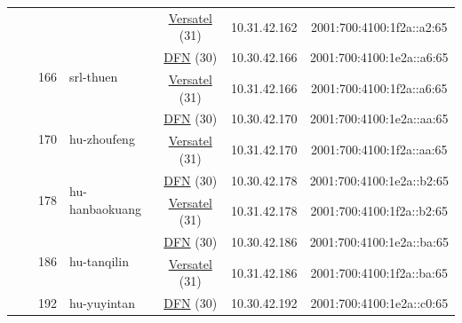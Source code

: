 \begin{small}
\begin{center}
\begin{longtable}{|c|c|c|c|c|c|c|c|}
  &  &  &  & \multicolumn{2}{|c|}{\tiny{\href{http://www.versatel.de}{Versatel} (31)}} & \tiny{10.31.42.162} & \tiny{2001:700:4100:1f2a::a2:65} \\* \cline{3-3}\cline{4-4}\cline{5-5}\cline{6-6}\cline{7-7}\cline{8-8}
  &  & \multirow{2}{*}{\tiny{166}} & \multicolumn{1}{|l|}{\multirow{2}{*}{\tiny{srl-thuen}}} & \multicolumn{2}{|c|}{\tiny{\href{https://www.dfn.de}{DFN} (30)}} & \tiny{10.30.42.166} & \tiny{2001:700:4100:1e2a::a6:65} \\* \cline{5-5}\cline{6-6}\cline{7-7}\cline{8-8}
  &  &  &  & \multicolumn{2}{|c|}{\tiny{\href{http://www.versatel.de}{Versatel} (31)}} & \tiny{10.31.42.166} & \tiny{2001:700:4100:1f2a::a6:65} \\* \cline{3-3}\cline{4-4}\cline{5-5}\cline{6-6}\cline{7-7}\cline{8-8}
  &  & \multirow{2}{*}{\tiny{170}} & \multicolumn{1}{|l|}{\multirow{2}{*}{\tiny{hu-zhoufeng}}} & \multicolumn{2}{|c|}{\tiny{\href{https://www.dfn.de}{DFN} (30)}} & \tiny{10.30.42.170} & \tiny{2001:700:4100:1e2a::aa:65} \\* \cline{5-5}\cline{6-6}\cline{7-7}\cline{8-8}
  &  &  &  & \multicolumn{2}{|c|}{\tiny{\href{http://www.versatel.de}{Versatel} (31)}} & \tiny{10.31.42.170} & \tiny{2001:700:4100:1f2a::aa:65} \\* \cline{3-3}\cline{4-4}\cline{5-5}\cline{6-6}\cline{7-7}\cline{8-8}
  &  & \multirow{2}{*}{\tiny{178}} & \multicolumn{1}{|l|}{\multirow{2}{*}{\tiny{hu-hanbaokuang}}} & \multicolumn{2}{|c|}{\tiny{\href{https://www.dfn.de}{DFN} (30)}} & \tiny{10.30.42.178} & \tiny{2001:700:4100:1e2a::b2:65} \\* \cline{5-5}\cline{6-6}\cline{7-7}\cline{8-8}
  &  &  &  & \multicolumn{2}{|c|}{\tiny{\href{http://www.versatel.de}{Versatel} (31)}} & \tiny{10.31.42.178} & \tiny{2001:700:4100:1f2a::b2:65} \\* \cline{3-3}\cline{4-4}\cline{5-5}\cline{6-6}\cline{7-7}\cline{8-8}
  &  & \multirow{2}{*}{\tiny{186}} & \multicolumn{1}{|l|}{\multirow{2}{*}{\tiny{hu-tanqilin}}} & \multicolumn{2}{|c|}{\tiny{\href{https://www.dfn.de}{DFN} (30)}} & \tiny{10.30.42.186} & \tiny{2001:700:4100:1e2a::ba:65} \\* \cline{5-5}\cline{6-6}\cline{7-7}\cline{8-8}
  &  &  &  & \multicolumn{2}{|c|}{\tiny{\href{http://www.versatel.de}{Versatel} (31)}} & \tiny{10.31.42.186} & \tiny{2001:700:4100:1f2a::ba:65} \\* \cline{3-3}\cline{4-4}\cline{5-5}\cline{6-6}\cline{7-7}\cline{8-8}
  &  & \multirow{2}{*}{\tiny{192}} & \multicolumn{1}{|l|}{\multirow{2}{*}{\tiny{hu-yuyintan}}} & \multicolumn{2}{|c|}{\tiny{\href{https://www.dfn.de}{DFN} (30)}} & \tiny{10.30.42.192} & \tiny{2001:700:4100:1e2a::c0:65} \\* \cline{5-5}\cline{6-6}\cline{7-7}\cline{8-8}

\end{longtable}
\end{center}
\end{small}
